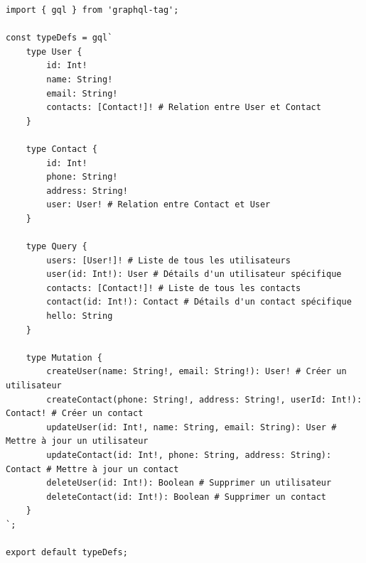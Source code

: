 \documentclass[a4paper,12pt]{article}
\begin{document}
\begin{verbatim}
import { gql } from 'graphql-tag';

const typeDefs = gql`
    type User {
        id: Int!
        name: String!
        email: String!
        contacts: [Contact!]! # Relation entre User et Contact
    }
  
    type Contact {
        id: Int!
        phone: String!
        address: String!
        user: User! # Relation entre Contact et User
    }
    
    type Query {
        users: [User!]! # Liste de tous les utilisateurs
        user(id: Int!): User # Détails d'un utilisateur spécifique
        contacts: [Contact!]! # Liste de tous les contacts
        contact(id: Int!): Contact # Détails d'un contact spécifique
        hello: String
    }
    
    type Mutation {
        createUser(name: String!, email: String!): User! # Créer un utilisateur
        createContact(phone: String!, address: String!, userId: Int!): Contact! # Créer un contact
        updateUser(id: Int!, name: String, email: String): User # Mettre à jour un utilisateur
        updateContact(id: Int!, phone: String, address: String): Contact # Mettre à jour un contact
        deleteUser(id: Int!): Boolean # Supprimer un utilisateur
        deleteContact(id: Int!): Boolean # Supprimer un contact
    }  
`;

export default typeDefs;
\end{verbatim}
\end{document}
